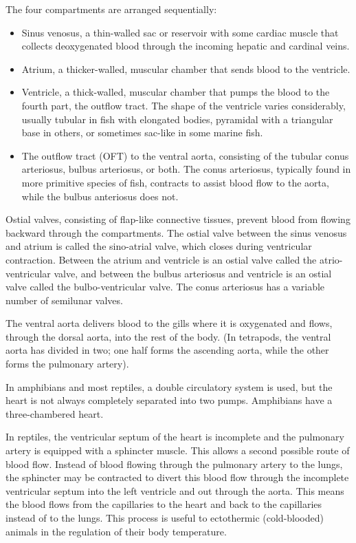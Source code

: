 The four compartments are arranged sequentially:

\begin{itemize}
\tightlist
\item
  Sinus venosus, a thin-walled sac or reservoir with some cardiac muscle that collects deoxygenated blood through the incoming hepatic and cardinal veins.
\item
  Atrium, a thicker-walled, muscular chamber that sends blood to the ventricle.
\item
  Ventricle, a thick-walled, muscular chamber that pumps the blood to the fourth part, the outflow tract. The shape of the ventricle varies considerably, usually tubular in fish with elongated bodies, pyramidal with a triangular base in others, or sometimes sac-like in some marine fish.
\item
  The outflow tract (OFT) to the ventral aorta, consisting of the tubular conus arteriosus, bulbus arteriosus, or both. The conus arteriosus, typically found in more primitive species of fish, contracts to assist blood flow to the aorta, while the bulbus anteriosus does not.
\end{itemize}

Ostial valves, consisting of flap-like connective tissues, prevent blood from flowing backward through the compartments. The ostial valve between the sinus venosus and atrium is called the sino-atrial valve, which closes during ventricular contraction. Between the atrium and ventricle is an ostial valve called the atrio-ventricular valve, and between the bulbus arteriosus and ventricle is an ostial valve called the bulbo-ventricular valve. The conus arteriosus has a variable number of semilunar valves.

The ventral aorta delivers blood to the gills where it is oxygenated and flows, through the dorsal aorta, into the rest of the body. (In tetrapods, the ventral aorta has divided in two; one half forms the ascending aorta, while the other forms the pulmonary artery).

In amphibians and most reptiles, a double circulatory system is used, but the heart is not always completely separated into two pumps. Amphibians have a three-chambered heart.

In reptiles, the ventricular septum of the heart is incomplete and the pulmonary artery is equipped with a sphincter muscle. This allows a second possible route of blood flow. Instead of blood flowing through the pulmonary artery to the lungs, the sphincter may be contracted to divert this blood flow through the incomplete ventricular septum into the left ventricle and out through the aorta. This means the blood flows from the capillaries to the heart and back to the capillaries instead of to the lungs. This process is useful to ectothermic (cold-blooded) animals in the regulation of their body temperature.

